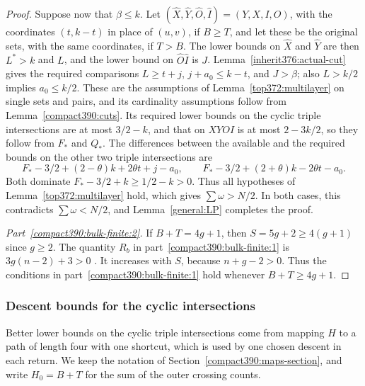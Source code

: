 \begin{proof}
Suppose now that $\beta\le k$. Let
$(\widehat X,\widehat Y,\widehat O,\widehat I)=(Y,X,I,O)$, with the coordinates $(t,k-t)$ in place of $(u,v)$,
if $B\ge T$, and let these be the original sets, with the same coordinates, if $T>B$.
The lower bounds on $\widehat X$ and $\widehat Y$ are then $L^*>k$ and $L$, and the lower bound
on $\widehat O\widehat I$ is $J$.
Lemma~\ref{inherit376:actual-cut} gives the required comparisons
$L\ge t+j$, $j+a_0\le k-t$, and $J>\beta$; also $L>k/2$ implies $a_0\le k/2$.
These are the assumptions of
Lemma~\ref{top372:multilayer} on single sets and pairs, and its cardinality assumptions follow from
Lemma~\ref{compact390:cuts}. Its required lower bounds on the cyclic triple intersections are at most
$3/2-k$, and that on $XYOI$ is at most $2-3k/2$, so they follow
from $F_*$ and $Q_*$. The differences between the available and the required bounds on the other two triple intersections are
\[
 F_*-3/2+(2-\theta)k+2\theta t+j-a_0,\qquad
 F_*-3/2+(2+\theta)k-2\theta t-a_0.
\]
Both dominate $F_*-3/2+k\ge1/2-k>0$.
Thus all hypotheses of Lemma~\ref{top372:multilayer} hold, which gives
$\sum\omega>N/2$. In both cases, this contradicts $\sum\omega<N/2$, and
Lemma~\ref{general:LP} completes the proof.

\emph{Part~\ref{compact390:bulk-finite:2}.} If $B+T=4g+1$, then
$S=5g+2\ge4(g+1)$ since $g\ge2$. The quantity $R_b$ in part~\ref{compact390:bulk-finite:1} is $3g(n-2)+3>0$ . It increases with $S$, because $n+g-2>0$.
Thus the conditions in part~\ref{compact390:bulk-finite:1} hold whenever $B+T\ge4g+1$.
\end{proof}

\subsubsection{Descent bounds for the cyclic intersections}
\label{short392:cyclic-section}

Better lower bounds on the cyclic triple intersections come from mapping $H$ to a path of length four with one shortcut, which is used by one chosen descent in each return. We keep the notation of Section~\ref{compact390:maps-section}, and write
$H_0=B+T$ for the sum of the outer crossing counts.

